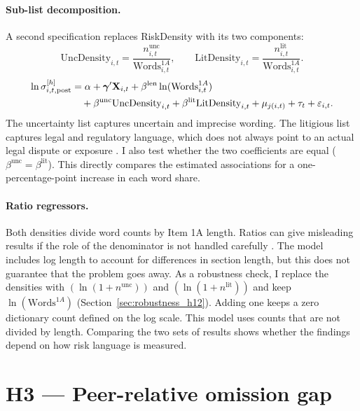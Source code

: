 \paragraph{Sub-list decomposition.} A second specification replaces
RiskDensity with its two components:
\[
\mathrm{UncDensity}_{i,t} = \frac{n^{\mathrm{unc}}_{i,t}}{\text{Words}^{1A}_{i,t}},
\qquad
\mathrm{LitDensity}_{i,t} = \frac{n^{\mathrm{lit}}_{i,t}}{\text{Words}^{1A}_{i,t}}.
\]
\begin{align}
\ln \sigma_{i,t,\mathrm{post}}^{[h]}
&= \alpha + \boldsymbol{\gamma}'\mathbf{X}_{i,t}
+ \beta^{\text{len}} \ln(\text{Words}^{1A}_{i,t})
\notag \\ &\quad + \beta^{\text{unc}} \mathrm{UncDensity}_{i,t}
+ \beta^{\text{lit}} \mathrm{LitDensity}_{i,t}
+ \mu_{j(i,t)} + \tau_t + \varepsilon_{i,t}.
\label{eq:decomposition_model}
\end{align}
The uncertainty list captures uncertain and imprecise wording. The litigious list captures legal and regulatory language, which does not always point to an actual legal dispute or exposure \parencite{loughran2011}. I also test whether the two coefficients are equal ($\beta^{\text{unc}}=\beta^{\text{lit}}$). This directly compares the estimated associations for a one-percentage-point increase in each word share.

\paragraph{Ratio regressors.} Both densities divide word counts by Item 1A
length. Ratios can give misleading results if the role of the denominator is
not handled carefully \parencite{kronmal1993}. The model includes log length to
account for differences in section length, but this does not guarantee that
the problem goes away. As a robustness check, I replace the densities with
$(\ln(1+n^{\mathrm{unc}}))$ and $(\ln(1+n^{\mathrm{lit}}))$ and keep
$\ln(\text{Words}^{1A})$ (Section~\ref{sec:robustness_h12}). Adding one keeps a zero dictionary count defined on the log scale. This model uses
counts that are not divided by length. Comparing the two sets of results shows
whether the findings depend on how risk language is measured.


\section{H3 --- Peer-relative omission gap}
\label{sec:h3}

